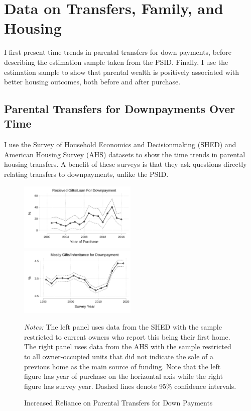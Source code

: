 \documentclass[12pt]{article}
\begin{document}
\section{Data on Transfers, Family, and Housing}\label{sec:data}
I first present time trends in parental transfers for down payments, before describing the estimation sample taken from the PSID. Finally, I use the estimation sample to show that parental wealth is positively associated with better housing outcomes, both before and after purchase.

\subsection{Parental Transfers for Downpayments Over Time}\label{sec:overtime}
I use the Survey of Household Economics and Decisionmaking (SHED) and American Housing Survey (AHS) datasets to show the time trends in parental housing transfers. A benefit of these surveys is that they ask questions directly relating transfers to downpayments, unlike the PSID. 


\begin{figure}
	\caption{Increased Reliance on Parental Transfers for Down Payments}\label{fig:motivation}
	\includegraphics[width=0.5\textwidth]{../tabfig/descr/SHED_gift_scatter_SE_paper}%
	\includegraphics[width=0.5\textwidth]{../tabfig/descr/AHS_majorsourcedown_surveyyear_paper}%
	
	 {\begin{footnotesize} \textit{Notes:} The left panel uses data from the SHED with the sample restricted to current owners who report this being their first home. The right panel uses data from the AHS with the sample restricted to all owner-occupied units that did not indicate the sale of a previous home as the main source of funding.  Note that the left figure has year of purchase on the horizontal axis while the right figure has survey year. Dashed lines denote 95\% confidence intervals.\end{footnotesize}}
\end{figure}
\end{document}
